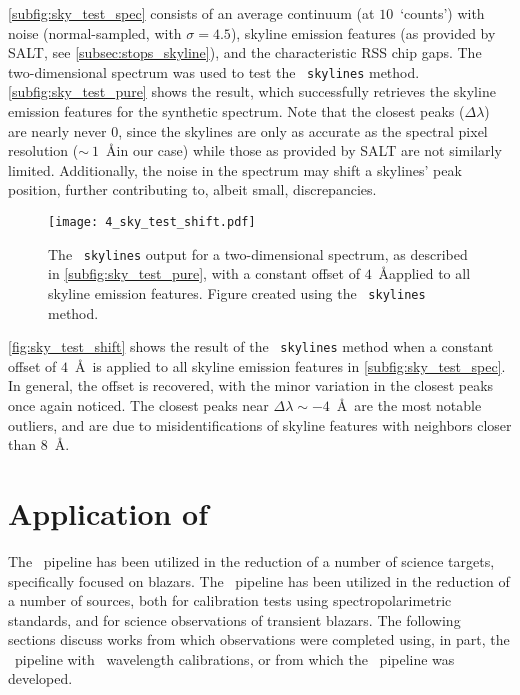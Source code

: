 \autoref{subfig:sky_test_spec} consists of an average continuum (at $10$~`counts') with noise (normal-sampled, with $\sigma = 4.5$), skyline emission features (as provided by \gls{SALT}, see \autoref{subsec:stops_skyline}), and the characteristic \gls{RSS} chip gaps.
The two-dimensional spectrum was used to test the \stops\ \texttt{skylines} method.
\autoref{subfig:sky_test_pure} shows the result, which successfully retrieves the skyline emission features for the synthetic spectrum.
Note that the closest peaks ($\Delta \lambda$) are nearly never $0$, since the skylines are only as accurate as the spectral pixel resolution ($\sim~1$~\AA in our case) while those as provided by \gls{SALT} are not similarly limited.
Additionally, the noise in the spectrum may shift a skylines' peak position, further contributing to, albeit small, discrepancies.

\begin{figure}[t]
    \centering
    \texttt{[image: 4\_sky\_test\_shift.pdf]}
    \caption{The \stops\ \texttt{skylines} output for a two-dimensional spectrum, as described in \autoref{subfig:sky_test_pure}, with a constant offset of $4$~\AA applied to all skyline emission features. Figure created using the \stops\ \texttt{skylines} method.}
    \label{fig:sky_test_shift}
\end{figure}

\autoref{fig:sky_test_shift} shows the result of the \stops\ \texttt{skylines} method when a constant offset of $4$~\AA\ is applied to all skyline emission features in \autoref{subfig:sky_test_spec}.
In general, the offset is recovered, with the minor variation in the closest peaks once again noticed.
The closest peaks near $\Delta \lambda \sim -4$~\AA\ are the most notable outliers, and are due to misidentifications of skyline features with neighbors closer than $8$~\AA.

\section[Application of \textsc{stops}]{Application of \stops} \label{sec:app_stops}

The \stops\ pipeline has been utilized in the reduction of a number of science targets, specifically focused on blazars.
The \stops\ pipeline has been utilized in the reduction of a number of sources, both for calibration tests using spectropolarimetric standards, and for science observations of transient blazars.
The following sections discuss works from which observations were completed using, in part, the \stops\ pipeline with \iraf\ wavelength calibrations, or from which the \stops\ pipeline was developed.

